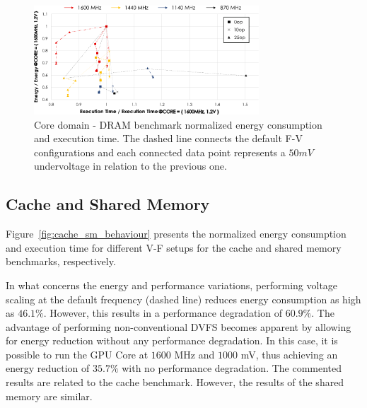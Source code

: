 \begin{figure}[htb]
  \centering
  \includegraphics[width=0.75\textwidth]{Figures/GPU_characterization/DRAM_Core_domain_behaviour.pdf}
  \caption{Core domain - DRAM benchmark normalized energy consumption and execution time. The dashed line connects the default F-V configurations and each connected data point represents a $50mV$ undervoltage in relation to the previous one.}
  \label{fig:DRAM_Corebehaviour}
\end{figure}


\subsection{Cache and Shared Memory}

\label{sec:cache_sm__behaviour}

Figure~\ref{fig:cache_sm_behaviour} presents the normalized energy consumption and execution time for different V-F setups for the cache and shared memory benchmarks, respectively.  

In what concerns the energy and performance variations, performing voltage scaling at the default frequency (dashed line) reduces energy consumption as high as $46.1\% $. However, this results in a performance degradation of $60.9\%$. The advantage of performing non-conventional DVFS becomes apparent by allowing for energy reduction without any performance degradation. In this case, it is possible to run the GPU Core at $1600$ MHz and $1000$ mV, thus achieving an energy reduction of $35.7\%$ with no performance degradation. The commented results are related to the cache benchmark. However, the results of the shared memory are similar.

